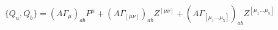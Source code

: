 \begin{equation}
\{Q_a,Q_b\}= (A\Gamma_\mu )_{ab}P^\mu +(A\Gamma_{[\mu\nu]})_{ab}
Z^{[\mu\nu]} +
(A\Gamma_{[\mu_1\dots\mu_5]})_{ab}Z^{[\mu_1\dots\mu_5]}
\label{Malg}
\end{equation}

